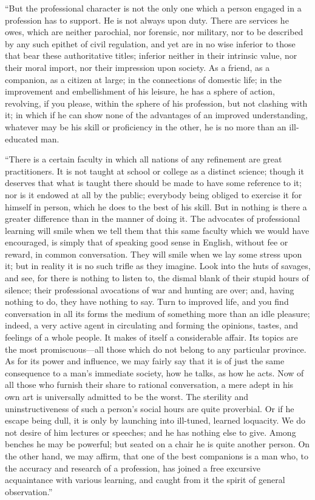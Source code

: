 ``But the professional character is not the only one which a
person engaged in a profession has to support. He is not always upon
duty. There are services he owes, which are neither parochial, nor
forensic, nor military, nor to be described by any such epithet of
civil regulation, and yet are in no wise inferior to those that bear
these authoritative titles; inferior neither in their intrinsic value,
nor their moral import, nor their impression upon society. As a
friend, as a companion, as a citizen at large; in the connections of
domestic life; in the improvement and embellishment of his leisure, he
has a sphere of action, revolving, if you please, within the sphere of
his profession, but not clashing with it; in which if he can show none
of the advantages of an improved understanding, whatever may be his
skill or proficiency in the other, he is no more than an ill-educated
man.

``There is a certain faculty in which all nations of any
refinement are great practitioners. It is not taught at school or
college as a distinct science; though it deserves that what is taught
there should be made to have some reference to it; nor is it endowed
at all by the public; everybody being obliged to exercise it for
himself in person, which he does to the best of his skill. But in
nothing is there a greater difference than in the manner of doing it.
The advocates of professional learning will smile when we tell them
that this same faculty which we would have encouraged, is simply that
of speaking good sense in English, without fee or reward, in common
conversation. They will smile when we lay some stress upon it; but in
reality it is no such trifle as they imagine. Look into the huts of
savages, and see, for there is nothing to listen to, the dismal blank
of their stupid hours of silence; their professional avocations of war
and hunting are over; and, having nothing to do, they have
nothing to say. Turn to improved life, and you find conversation in
all its forms the medium of something more than an idle pleasure;
indeed, a very active agent in circulating and forming the opinions,
tastes, and feelings of a whole people. It makes of itself a
considerable affair. Its topics are the most promiscuous—all those
which do not belong to any particular province. As for its power and
influence, we may fairly say that it is of just the same consequence
to a man's immediate society, how he talks, as how he acts. Now of all
those who furnish their share to rational conversation, a mere adept
in his own art is universally admitted to be the worst. The sterility
and uninstructiveness of such a person's social hours are quite
proverbial. Or if he escape being dull, it is only by launching into
ill-tuned, learned loquacity. We do not desire of him lectures or
speeches; and he has nothing else to give. Among benches he may be
powerful; but seated on a chair he is quite another person. On the
other hand, we may affirm, that one of the best companions is a man
who, to the accuracy and research of a profession, has joined a free
excursive acquaintance with various learning, and caught from it the
spirit of general observation.''

